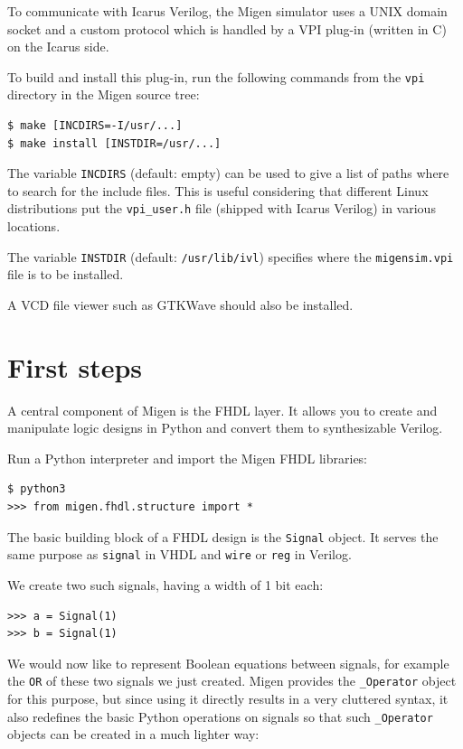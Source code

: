 \documentclass[11pt]{paper}
\begin{document}
To communicate with Icarus Verilog, the Migen simulator uses a UNIX domain socket and a custom protocol which is handled by a VPI plug-in (written in C) on the Icarus side.

To build and install this plug-in, run the following commands from the \verb!vpi! directory in the Migen source tree:

\begin{verbatim}
$ make [INCDIRS=-I/usr/...]
$ make install [INSTDIR=/usr/...]
\end{verbatim}

The variable \verb!INCDIRS! (default: empty) can be used to give a list of paths where to search for the include files. This is useful considering that different Linux distributions put the \verb!vpi_user.h! file (shipped with Icarus Verilog) in various locations.

The variable \verb!INSTDIR! (default: \verb!/usr/lib/ivl!) specifies where the \verb!migensim.vpi! file is to be installed.

A VCD file viewer such as GTKWave should also be installed.

\section{First steps}
A central component of Migen is the FHDL layer. It allows you to create and manipulate logic designs in Python and convert them to synthesizable Verilog.

Run a Python interpreter and import the Migen FHDL libraries:
\begin{verbatim}
$ python3
>>> from migen.fhdl.structure import *
\end{verbatim}

The basic building block of a FHDL design is the \verb!Signal! object. It serves the same purpose as \verb!signal! in VHDL and \verb!wire! or \verb!reg! in Verilog.

We create two such signals, having a width of 1 bit each:
\begin{verbatim}
>>> a = Signal(1)
>>> b = Signal(1)
\end{verbatim}


We would now like to represent Boolean equations between signals, for example the \verb!OR! of these two signals we just created. Migen provides the \verb!_Operator! object for this purpose, but since using it directly results in a very cluttered syntax, it also redefines the basic Python operations on signals so that such \verb!_Operator! objects can be created in a much lighter way:
\end{document}
